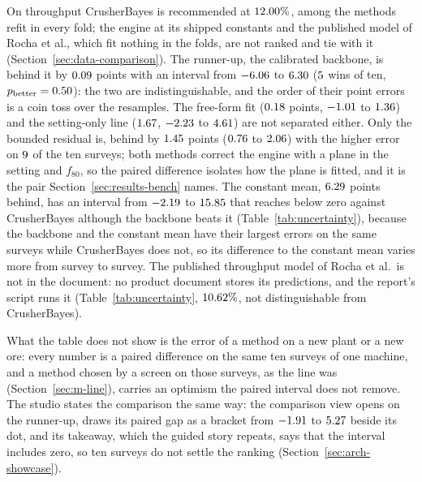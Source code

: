 On throughput CrusherBayes is recommended at $12.00\%$, among the methods refit in every fold; the engine at its shipped
constants and the published model of Rocha et al., which fit nothing in the folds, are not ranked and tie with it
(Section~\ref{sec:data-comparison}). The runner-up, the calibrated backbone, is behind it by $0.09$
points with an interval from $-6.06$ to $6.30$ ($5$ wins of ten, $p_{\mathrm{better}}=0.50$): the two are
indistinguishable, and the order of their point errors is a coin toss over the resamples. The free-form fit ($0.18$ points,
$-1.01$ to $1.36$) and the setting-only line ($1.67$, $-2.23$ to $4.61$) are not separated either. Only
the bounded residual is, behind by $1.45$ points ($0.76$ to $2.06$) with the higher error on $9$ of the ten
surveys; both methods correct the engine with a plane in the setting and $f_{80}$, so the paired difference isolates how the plane is
fitted, and it is the pair Section~\ref{sec:results-bench} names. The constant mean, $6.29$ points behind, has an interval from
$-2.19$ to $15.85$ that reaches below zero against CrusherBayes although the backbone beats it
(Table~\ref{tab:uncertainty}), because the backbone and the constant mean have their largest errors on the same surveys while CrusherBayes
does not, so its difference to the constant mean varies more from survey to survey. The published throughput model of Rocha et al.\ is not in the document: no product document stores its
predictions, and the report's script runs it (Table~\ref{tab:uncertainty}, $10.62\%$, not distinguishable from CrusherBayes).

What the table does not show is the error of a method on a new plant or a new ore: every number is a paired difference on the same
ten surveys of one machine, and a method chosen by a screen on those surveys, as the line was (Section~\ref{sec:m-line}), carries
an optimism the paired interval does not remove. The studio states the comparison the same way: the comparison view opens on the
runner-up, draws its paired gap as a bracket from $-1.91$ to $5.27$ beside its dot, and its takeaway, which the guided
story repeats, says that the interval includes zero, so ten surveys do not settle the ranking (Section~\ref{sec:arch-showcase}).

\begin{table}[!t]
\centering
\caption{Paired differences of the held-out absolute percentage error of every method against the recommended method on the ten
HP500 surveys, per target: document MAPE, mean paired difference $\bar d$ in points (positive: worse than the recommended method), its
$95\%$ percentile bootstrap interval over $\cmpB$ resamples (seed $\cmpSeed$; bold where it excludes zero), the surveys on which the
recommended method has the lower error and the share of resamples in which it is better on average. Generated from
\texttt{comparison.json}.}
\label{tab:comparison}
\scriptsize
\setlength{\tabcolsep}{3pt}

\end{table}

